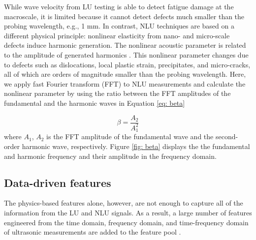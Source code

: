 \begin{itemize}
    While wave velocity from LU testing is able to detect fatigue damage at the macroscale, it is limited because it cannot detect defects much smaller than the probing wavelength, e.g., 1 mm. In contrast, NLU techniques are based on a different physical principle: nonlinear elasticity from nano- and micro-scale defects induce harmonic generation. The nonlinear acoustic parameter is related to the amplitude of generated harmonics \cite{nde-nlu-review-Matlack2014,nde-nlu-fatigue-Cantrell}. This nonlinear parameter changes due to defects such as dislocations, local plastic strain, precipitates, and micro-cracks, all of which are orders of magnitude smaller than the probing wavelength. Here, we apply fast Fourier transform (FFT) to NLU measurements and calculate the nonlinear parameter by using the ratio between the FFT amplitudes of the fundamental and the harmonic waves in Equation \eqref{eq: beta}

    \begin{equation}
        \beta = \frac{A_2}{A_1^2}
        \label{eq: beta}
    \end{equation}
    where $A_1$, $A_2$ is the FFT amplitude of the fundamental wave and the second-order harmonic wave, respectively. Figure \ref{fig: beta} displays the the fundamental and harmonic frequency and their amplitude in the frequency domain.
\end{itemize}

\subsection{Data-driven features}
The physics-based features alone, however, are not enough to capture all of the information from the LU and NLU signals. As a result, a large number of features engineered from the time domain, frequency domain, and time-frequency domain of ultrasonic measurements are added to the feature pool \cite{nde-lu-ml-defect-Sambath2011, nde-lu-ml-defect-s19194216}.

